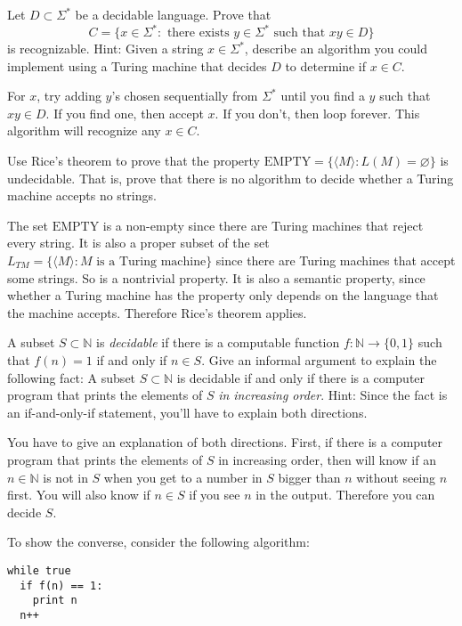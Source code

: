 \documentclass[12pt]{exam}
\newcommand{\N}{\mathbb{N}}
\begin{document}
\begin{questions}
\question Let $D \subset \Sigma^*$ be a decidable language. Prove that
$$C = \{x \in \Sigma^* : \text{ there exists } y \in \Sigma^* \text{ such that } xy \in D \}$$
is recognizable. Hint: Given a string $x \in \Sigma^*$, describe an algorithm you could implement using a Turing machine that decides $D$ to determine if $x \in C$. 
\begin{solution}
For $x$, try adding $y$'s chosen sequentially from $\Sigma^*$ until you find a $y$ such that $xy \in D$.  If you find one, then accept $x$.  If you don't, then loop forever.  This algorithm will recognize any $x \in C$.  
\end{solution}
\vfill

\question Use Rice's theorem to prove that the property $\text{EMPTY} = \{ \langle M \rangle : L(M) = \varnothing \}$ is undecidable.  That is, prove that there is no algorithm to decide whether a Turing machine accepts no strings.
\begin{solution}
The set $\text{EMPTY}$ is a non-empty since there are Turing machines that reject every string. It is also a proper subset of the set $L_{TM} = \{ \langle M \rangle : M \text{ is a Turing machine} \}$ since there are Turing machines that accept some strings.  So  is a nontrivial property.  It is also a semantic property, since whether a Turing machine has the property only depends on the language that the machine accepts.  Therefore Rice's theorem applies. 
\end{solution} 
\vfill

\newpage
\question A subset $S \subset \N$ is \emph{decidable} if there is a computable function $f:\N \rightarrow \{0,1\}$ such that $f(n) = 1$ if and only if $n \in S$.  Give an informal argument to explain the following fact: A subset $S \subset \N$ is decidable if and only if there is a computer program that prints the elements of $S$ \textit{in increasing order}.  Hint: Since the fact is an if-and-only-if statement, you'll have to explain both directions.  
\begin{solution}
You have to give an explanation of both directions.  First, if there is a computer program that prints the elements of $S$ in increasing order, then will know if an $n \in \N$ is not in $S$ when you get to a number in $S$ bigger than $n$ without seeing $n$ first.  You will also know if $n \in S$ if you see $n$ in the output.  Therefore you can decide $S$.  

To show the converse, consider the following algorithm: 
\begin{verbatim}
while true
  if f(n) == 1:
    print n
  n++
\end{verbatim}
\end{solution}
\vfill


\end{questions}
\end{document}
